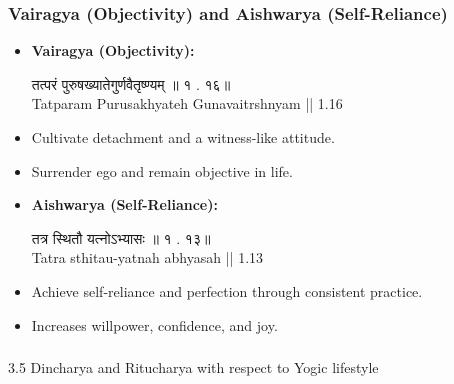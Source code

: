 \begin{frame}[fragile]\frametitle{Vairagya (Objectivity) and Aishwarya (Self-Reliance)}

      \begin{itemize}
        \item \textbf{Vairagya (Objectivity):}
        
        तत्परं   पुरुषख्यातेगुर्णवैतृष्ण्यम्   ॥   १ . १६॥ \\
        Tatparam Purusakhyateh Gunavaitrshnyam || 1.16
        
        \item Cultivate detachment and a witness-like attitude.
        \item Surrender ego and remain objective in life.
        \item \textbf{Aishwarya (Self-Reliance):}
        
        तत्र   स्थितौ   यत्नोऽभ्यासः   ॥   १ . १३॥ \\
        Tatra sthitau-yatnah abhyasah || 1.13
        
        \item Achieve self-reliance and perfection through consistent practice.
        \item Increases willpower, confidence, and joy.
      \end{itemize}

\end{frame}

\begin{frame}[fragile]\frametitle{}
\begin{center}
{\Large 3.5 Dincharya and Ritucharya with respect to Yogic lifestyle}
\end{center}
\end{frame}


